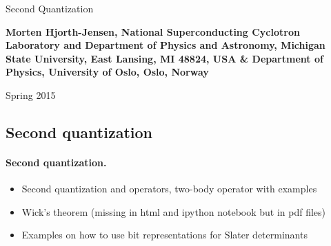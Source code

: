 \documentclass[%
twoside,                 %
final,                   %
10pt]{article}
\begin{document}






\thispagestyle{empty}

\begin{center}
{\LARGE\bf
\begin{spacing}{1.25}
Second Quantization
\end{spacing}
}
\end{center}


\begin{center}
{\bf Morten Hjorth-Jensen, National Superconducting Cyclotron Laboratory and Department of Physics and Astronomy, Michigan State University, East Lansing, MI 48824, USA {\&} Department of Physics, University of Oslo, Oslo, Norway${}^{}$} \\ [0mm]
\end{center}

    \begin{center}
\end{center}
    

\begin{center} %
Spring 2015
\end{center}

\vspace{1cm}


\subsection{Second quantization}


\paragraph{Second quantization.}
\begin{itemize}
\item Second quantization and operators, two-body operator with examples 

\item Wick's theorem (missing in html and ipython notebook but in pdf files)

\item Examples on how to use bit representations for Slater determinants
\end{itemize}
\end{document}
